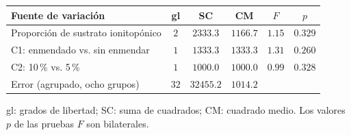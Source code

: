 \begin{tabular}{lccccc}
\hline\hline
\textbf{Fuente de variaci\'on} & \textbf{gl} & \textbf{SC} & \textbf{CM} & \textbf{$F$} & \textbf{$p$} \\
\hline
Proporci\'on de sustrato ionitop\'onico & $2$ & $2333.3$ & $1166.7$ & $1.15$ & $0.329$ \\
\quad C1: enmendado vs. sin enmendar & $1$ & $1333.3$ & $1333.3$ & $1.31$ & $0.260$ \\
\quad C2: 10\,\% vs. 5\,\% & $1$ & $1000.0$ & $1000.0$ & $0.99$ & $0.328$ \\
Error (agrupado, ocho grupos) & $32$ & $32455.2$ & $1014.2$ &  &  \\
\hline
\end{tabular}
\par\vspace{4pt}
\parbox{0.94\linewidth}{\footnotesize gl: grados de libertad; SC: suma de cuadrados; CM: cuadrado medio. Los valores $p$ de las pruebas $F$ son bilaterales.}
